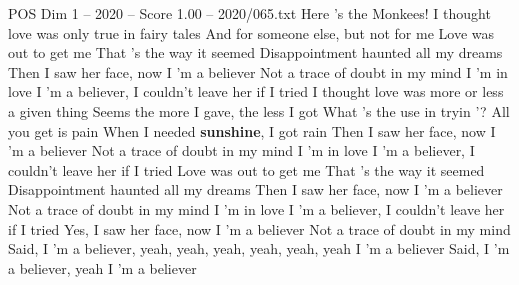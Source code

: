 \begin{textsample}{POS Dim 1 – 2020 – Score 1.00 – 2020/065.txt}  \label{ex:f1_pos_011}
Here 's the Monkees!
I thought love was only true in fairy tales And for someone else, but not for me Love was out to get me That 's the way it seemed Disappointment haunted all my dreams Then I saw her face, now I 'm a believer Not a trace of doubt in my mind I 'm in love I 'm a believer, I couldn't leave her if I tried I thought love was more or less a given thing Seems the more I gave, the less I got What 's the use in tryin '?
All you get is pain When I needed \textbf{sunshine}, I got rain Then I saw her face, now I 'm a believer Not a trace of doubt in my mind I 'm in love I 'm a believer, I couldn't leave her if I tried Love was out to get me That 's the way it seemed Disappointment haunted all my dreams Then I saw her face, now I 'm a believer Not a trace of doubt in my mind I 'm in love I 'm a believer, I couldn't leave her if I tried Yes, I saw her face, now I 'm a believer Not a trace of doubt in my mind Said, I 'm a believer, yeah, yeah, yeah, yeah, yeah, yeah I 'm a believer Said, I 'm a believer, yeah I 'm a believer

\end{textsample}

